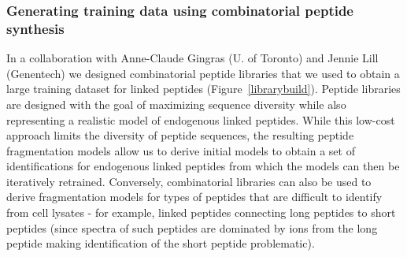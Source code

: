 
\subsubsection{Generating training data using combinatorial peptide synthesis}

In a collaboration with Anne-Claude  Gingras (U. of Toronto) and Jennie Lill (Genentech) we designed  combinatorial peptide libraries that we used to obtain a large training dataset for linked peptides (Figure~\ref{librarybuild}). Peptide libraries are designed with the goal of maximizing sequence diversity while also representing a realistic model of endogenous linked peptides. While this low-cost approach limits the diversity of peptide sequences, the resulting peptide fragmentation models allow us to derive initial models  to obtain a set of identifications for endogenous linked peptides from which the models can then be iteratively retrained. Conversely, combinatorial libraries can also be used to derive fragmentation models for types of peptides that are difficult to identify from cell lysates \-- for example, linked peptides connecting long peptides to short peptides (since spectra of such peptides are dominated by ions from the long peptide making identification of the short peptide problematic).

